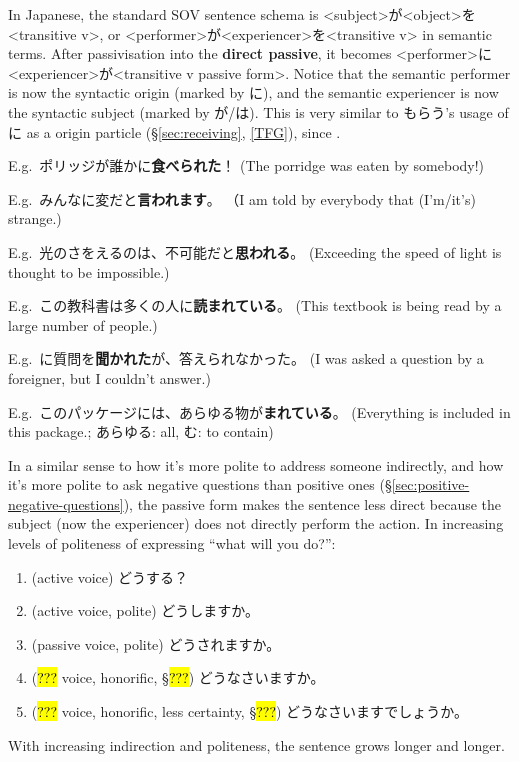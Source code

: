 \documentclass[../nihongo-gakushuu-kyouzai.tex]{subfiles}
\begin{document}

In Japanese, the standard SOV sentence schema is <subject>が<object>を<transitive v>, or <performer>が<experiencer>を<transitive v> in semantic terms. After passivisation into the \textbf{direct passive}, it becomes <performer>に<experiencer>が<transitive v passive form>. Notice that the semantic performer is now the syntactic origin (marked by に), and the semantic experiencer is now the syntactic subject (marked by が/は). This is very similar to もらう's usage of に as a origin particle (\S\ref{sec:receiving}, \href{https://www.tofugu.com/japanese-grammar/particle-ni/\#in-social-interactions-and-transactions}{[TFG]}), since .

E.g.\ ポリッジが誰かに\textbf{食べられた}！ (The porridge was eaten by somebody!)

E.g.\ みんなに変だと\textbf{言われます}。 （I am told by everybody that (I'm/it's) strange.)

E.g.\ 光のさをえるのは、不可能だと\textbf{思われる}。 (Exceeding the speed of light is thought to be impossible.)

E.g.\ この教科書は多くの人に\textbf{読まれている}。 (This textbook is being read by a large number of people.)

E.g.\ に質問を\textbf{聞かれた}が、答えられなかった。 (I was asked a question by a foreigner, but I couldn't answer.)

E.g.\ このパッケージには、あらゆる物が\textbf{まれている}。 (Everything is included in this package.; あらゆる: all, む: to contain)

In a similar sense to how it's more polite to address someone indirectly, and how it's more polite to ask negative questions than positive ones (\S\ref{sec:positive-negative-questions}), the passive form makes the sentence less direct because the subject (now the experiencer) does not directly perform the action. In increasing levels of politeness of expressing ``what will you do?'':
\begin{enumerate}[label=\arabic*.]
    \item (active voice) どうする？
    \item (active voice, polite) どうしますか。
    \item (passive voice, polite) どうされますか。
    \item (\hl{???} voice, honorific, \S\hl{???}) どうなさいますか。
    \item (\hl{???} voice, honorific, less certainty, \S\hl{???}) どうなさいますでしょうか。
\end{enumerate}
With increasing indirection and politeness, the sentence grows longer and longer.
\end{document}
